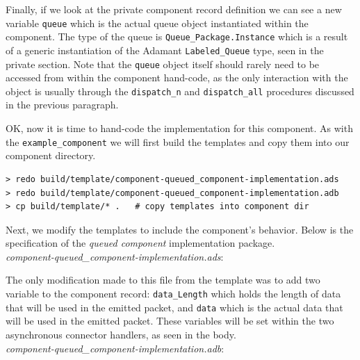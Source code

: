 Finally, if we look at the private component record definition we can see a new variable \texttt{queue} which is the actual queue object instantiated within the component. The type of the queue is \texttt{Queue\_Package.Instance} which is a result of a generic instantiation of the Adamant \texttt{Labeled\_Queue} type, seen in the private section. Note that the \texttt{queue} object itself should rarely need to be accessed from within the component hand-code, as the only interaction with the object is usually through the \texttt{dispatch\_n} and \texttt{dispatch\_all} procedures discussed in the previous paragraph.

OK, now it is time to hand-code the implementation for this component. As with the \texttt{example\_component} we will first build the templates and copy them into our component directory.

\vspace{5mm} %
\begin{verbatim}
> redo build/template/component-queued_component-implementation.ads 
> redo build/template/component-queued_component-implementation.adb 
> cp build/template/* .   # copy templates into component dir
\end{verbatim}
\vspace{5mm} %

Next, we modify the templates to include the component's behavior. Below is the specification of the \textit{queued component} implementation package. \\

\textit{component-queued\_component-implementation.ads}:

The only modification made to this file from the template was to add two variable to the component record: \texttt{data\_Length} which holds the length of data that will be used in the emitted packet, and \texttt{data} which is the actual data that will be used in the emitted packet. These variables will be set within the two asynchronous connector handlers, as seen in the body. \\

\textit{component-queued\_component-implementation.adb}:

